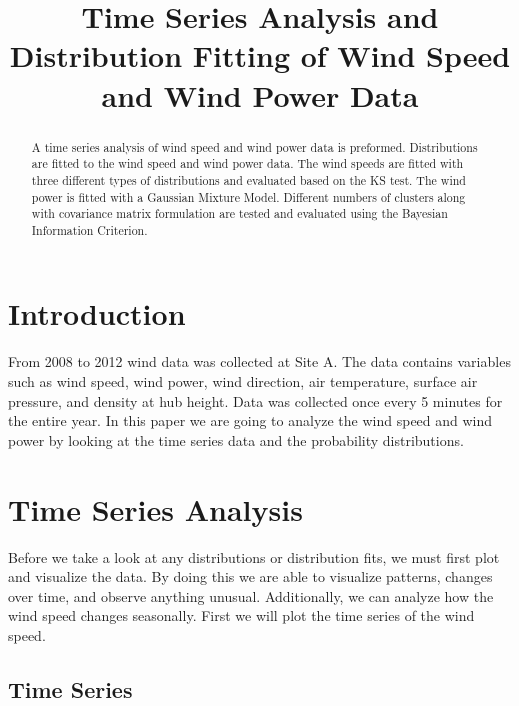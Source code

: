 \documentclass{IEEEtran}
\begin{document}
  \title{Time Series Analysis and Distribution Fitting of Wind Speed and Wind Power Data}
  \author{
  }

  \maketitle

  \begin{abstract}
    A time series analysis of wind speed and wind power data is preformed. Distributions are fitted to the wind speed and wind power data. The wind speeds are fitted with three different types of distributions and evaluated based on the KS test. The wind power is fitted with a Gaussian Mixture Model. Different numbers of clusters along with covariance matrix formulation are tested and evaluated using the Bayesian Information Criterion.
  \end{abstract}

  \section{Introduction}

  From 2008 to 2012 wind data was collected at Site A. The data contains variables such as wind speed, wind power, wind direction, air temperature, surface air pressure, and density at hub height. Data was collected once every 5 minutes for the entire year. In this paper we are going to analyze the wind speed and wind power by looking at the time series data and the probability distributions.

  \section{Time Series Analysis}

  Before we take a look at any distributions or distribution fits, we must first plot and visualize the data. By doing this we are able to visualize patterns, changes over time, and observe anything unusual. Additionally, we can analyze how the wind speed changes seasonally. First we will plot the time series of the wind speed.

  \subsection{Time Series}
\end{document}
